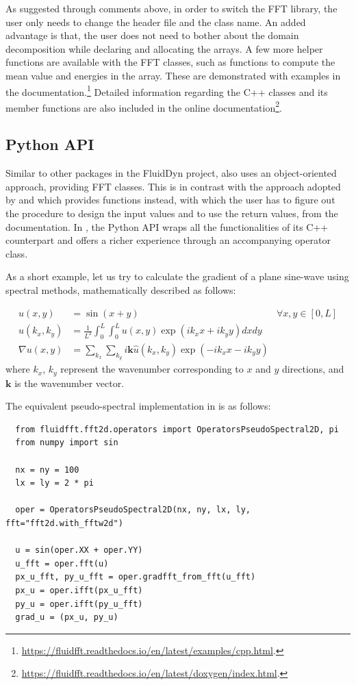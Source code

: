 As suggested through comments above, in order to switch the FFT library, the
user only needs to change the header file and the class name. An added
advantage is that, the user does not need to bother about the domain
decomposition while declaring and allocating the arrays. A few more helper
functions are available with the FFT classes, such as functions to compute the
mean value and energies in the array. These are demonstrated with examples in
the documentation.\footnote{%
\url{https://fluidfft.readthedocs.io/en/latest/examples/cpp.html}.}
%
Detailed information regarding the C++ classes and its member functions are
also included in the online documentation\footnote{%
\url{https://fluidfft.readthedocs.io/en/latest/doxygen/index.html}.}.

\subsection{Python API} Similar to other packages in the FluidDyn project,
 also uses an object-oriented approach, providing FFT classes.
%
This is in contrast with the approach adopted by  and  which provides functions instead, with which the user has to
figure out the procedure to design the input values and to use the return
values, from the documentation.
%
In , the Python API wraps all the functionalities of its C++
counterpart and offers a richer experience through an accompanying
operator class.

As a short example, let us try to calculate the gradient of a plane sine-wave
using spectral methods, mathematically described as follows:

\begin{align*}
  u(x,y) &=
    \sin(x + y) &\forall x,y \in \left[0, L \right] \\
  \hat u(k_x,k_y) &=
    \frac{1}{L^2}
    \int_0^{L}\int_0^{L}
    u(x,y) \exp(ik_x x + ik_y y) dx dy \\
  \nabla u(x,y) &=
    \sum_{k_x} \sum_{k_y}
    i\mathbf{k}
    \hat u(k_x,k_y) \exp(-ik_x x - ik_y y)
\end{align*}
%
where $k_x$, $k_y$ represent the wavenumber corresponding to $x$ and $y$ directions,
and $\mathbf{k}$ is the wavenumber vector.

The equivalent pseudo-spectral implementation in  is as follows:
\begin{verbatim}
  from fluidfft.fft2d.operators import OperatorsPseudoSpectral2D, pi
  from numpy import sin

  nx = ny = 100
  lx = ly = 2 * pi

  oper = OperatorsPseudoSpectral2D(nx, ny, lx, ly, fft="fft2d.with_fftw2d")

  u = sin(oper.XX + oper.YY)
  u_fft = oper.fft(u)
  px_u_fft, py_u_fft = oper.gradfft_from_fft(u_fft)
  px_u = oper.ifft(px_u_fft)
  py_u = oper.ifft(py_u_fft)
  grad_u = (px_u, py_u)
\end{verbatim}

